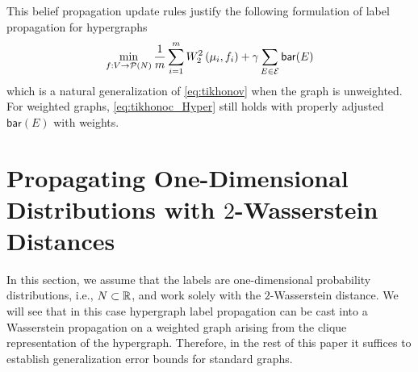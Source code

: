 \documentclass[letterpaper]{article} %
\begin{document}
This belief propagation update rules justify the following formulation of label propagation for hypergraphs
\begin{equation}\label{eq:tikhonoc_Hyper}
    \min_{f:V\to \P(N)} \frac{1}{m}\sum_{i=1}^m W_2^2\left(\mu_i, f_i\right) + \gamma\sum_{E\in \mathcal E}\mathsf{bar}(E)
\end{equation}
which is a natural generalization of \eqref{eq:tikhonov} when the graph is unweighted. For weighted graphs, \eqref{eq:tikhonoc_Hyper} still holds with properly adjusted $\mathsf{bar}(E)$ with weights.

\section{Propagating One-Dimensional Distributions with $2$-Wasserstein Distances}
In this section, we assume that the labels are one-dimensional probability distributions, i.e., $N\subset \R$, and work solely with the $2$-Wasserstein distance. We will see that in this case hypergraph label propagation can be cast into a Wasserstein propagation on a weighted graph arising from the clique representation of the hypergraph. Therefore, in the rest of this paper it suffices to establish generalization error bounds for standard graphs.
\end{document}
